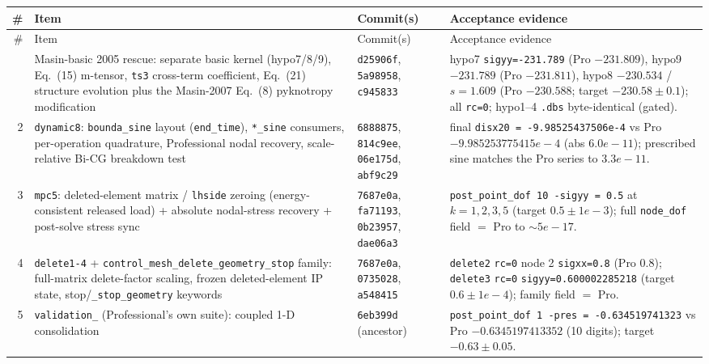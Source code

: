 \documentclass[11pt,a4paper]{report}
\newcommand{\code}[1]{\texttt{#1}}
\begin{document}
\begin{longtable}{@{}r L{5.0cm} L{2.6cm} L{5.6cm}@{}}
\toprule
\# & Item & Commit(s) & Acceptance evidence \\
\midrule
\endfirsthead
\toprule
\# & Item & Commit(s) & Acceptance evidence \\
\midrule
\endhead
\bottomrule
{} & Masin-basic 2005 rescue: separate basic kernel (hypo7/8/9), Eq.~(15)
    m-tensor, \code{ts3} cross-term coefficient, Eq.~(21) structure evolution
    plus the Masin-2007 Eq.~(8) pyknotropy modification
  & \code{d25906f}, \code{5a98958}, \code{c945833}
  & hypo7 \code{sigyy=-231.789} (Pro $-231.809$), hypo9 $-231.789$ (Pro
    $-231.811$), hypo8 $-230.534$ / $s=1.609$ (Pro $-230.588$; target
    $-230.58 \pm 0.1$); all \code{rc=0}; hypo1--4 \code{.dbs} byte-identical
    (gated). \\
2 & \code{dynamic8}: \code{bounda\_\allowbreak sine} layout (\code{end\_\allowbreak time}), \code{*\_\allowbreak sine}
    consumers, per-operation quadrature, Professional nodal recovery,
    scale-relative Bi-CG breakdown test
  & \code{6888875}, \code{814c9ee}, \code{06e175d}, \code{abf9c29}
  & final \code{disx20 = -9.98525437506e-4} vs Pro $-9.985253775415e-4$ (abs
    $6.0e-11$); prescribed sine matches the Pro series to $3.3e-11$. \\
3 & \code{mpc5}: deleted-element matrix / \code{lhside} zeroing
    (energy-consistent released load) + absolute nodal-stress recovery +
    post-solve stress sync
  & \code{7687e0a}, \code{fa71193}, \code{0b23957}, \code{dae06a3}
  & \code{post\_\allowbreak point\_\allowbreak dof 10 -sigyy = 0.5} at $k=1,2,3,5$ (target $0.5 \pm
    1e-3$); full \code{node\_\allowbreak dof} field $=$ Pro to $\sim 5e-17$. \\
4 & \code{delete1-4} + \code{control\_\allowbreak mesh\_\allowbreak delete\_\allowbreak geometry\_\allowbreak stop} family:
    full-matrix delete-factor scaling, frozen deleted-element IP state,
    stop/\code{\_\allowbreak stop\_\allowbreak geometry} keywords
  & \code{7687e0a}, \code{0735028}, \code{a548415}
  & \code{delete2} \code{rc=0} node 2 \code{sigxx=0.8} (Pro $0.8$);
    \code{delete3} \code{rc=0} \code{sigyy=0.600002285218} (target $0.6 \pm
    1e-4$); family field $=$ Pro. \\
5 & \code{validation\_} (Professional's own suite): coupled 1-D consolidation
  & \code{6eb399d} (ancestor)
  & \code{post\_\allowbreak point\_\allowbreak dof 1 -pres = -0.634519741323} vs Pro $-0.6345197413352$
    (10 digits); target $-0.63 \pm 0.05$. \\

\end{longtable}
\end{document}
